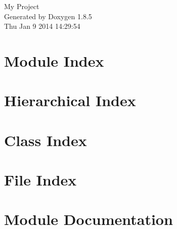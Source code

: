 \documentclass[twoside]{book}
\newcommand{\clearemptydoublepage}{%
  \newpage{\pagestyle{empty}\cleardoublepage}%
}
\begin{document}
\hypersetup{pageanchor=false}
\begin{titlepage}
\vspace*{7cm}
\begin{center}%
{\Large My Project }\\
\vspace*{1cm}
{\large Generated by Doxygen 1.8.5}\\
\vspace*{0.5cm}
{\small Thu Jan 9 2014 14:29:54}\\
\end{center}
\end{titlepage}
\clearemptydoublepage
\tableofcontents
\clearemptydoublepage
{}
\hypersetup{pageanchor=true}

\chapter{Module Index}

\chapter{Hierarchical Index}

\chapter{Class Index}

\chapter{File Index}

\chapter{Module Documentation}





\end{document}
